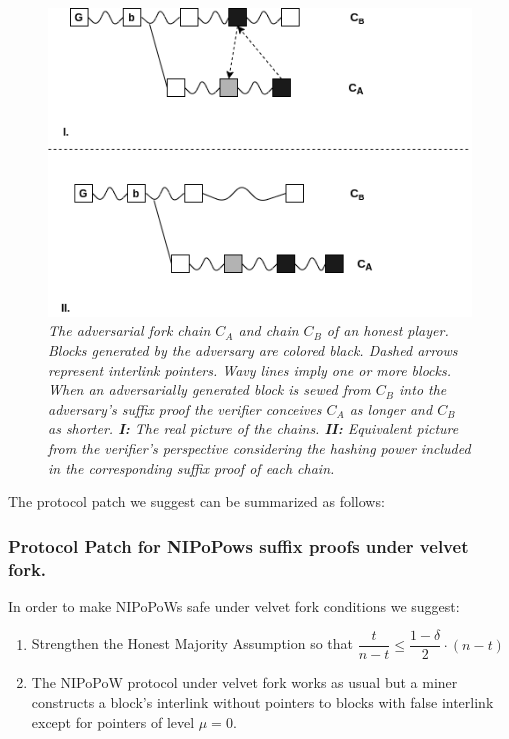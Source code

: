 \begin{figure}[h!]
	\begin{center}
		\includegraphics[scale=0.5]{figures/injection.png}
	\end{center}
	\caption{\textit{The adversarial fork chain $C_A$ and chain $C_B$ of an honest player. Blocks generated by the adversary are colored black. Dashed arrows represent interlink pointers. Wavy lines imply one or more blocks. When an adversarially generated block is sewed from $C_B$ into the adversary's suffix proof the verifier conceives $C_A$ as longer and $C_B$ as shorter.  \textbf{I:} The real picture
	 of the chains. \textbf{II:} Equivalent picture from the verifier's perspective considering the hashing power included in the corresponding suffix proof of each chain.}}
	\label{fig:injection}
\end{figure}


The protocol patch we suggest can be summarized as follows:\\


\subsubsection*{Protocol Patch for NIPoPows suffix proofs under velvet fork.} In order to make NIPoPoWs safe under velvet fork conditions we suggest:
\begin{enumerate}
\item Strengthen the Honest Majority Assumption so that $\dfrac{t}{n-t} \leq \dfrac{1-\delta}{2} \cdot (n-t)$
\item The NIPoPoW protocol under velvet fork works as usual but a miner constructs a block's interlink without pointers to blocks with false interlink except for pointers of level $\mu = 0$.
\end{enumerate}

